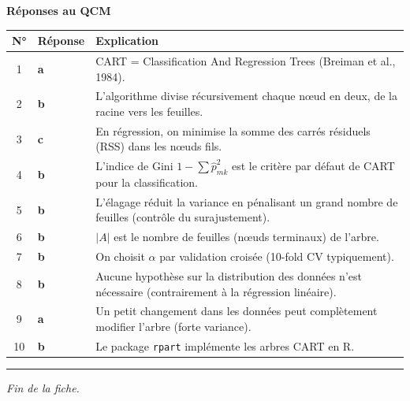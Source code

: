 \documentclass[a4paper,11pt]{article}
\begin{document}
\newpage
\label{reponses-tree}

\begin{center}
{\Large\textbf{Réponses au QCM}}
\end{center}

\medskip

\begin{tabular}{cp{2cm}p{9cm}}
\toprule
\textbf{N°} & \textbf{Réponse} & \textbf{Explication} \\
\midrule
1 & \textbf{a} & CART = Classification And Regression Trees (Breiman et al., 1984). \\
2 & \textbf{b} & L'algorithme divise récursivement chaque nœud en deux, de la racine vers les feuilles. \\
3 & \textbf{c} & En régression, on minimise la somme des carrés résiduels (RSS) dans les nœuds fils. \\
4 & \textbf{b} & L'indice de Gini $1 - \sum \hat{p}_{mk}^2$ est le critère par défaut de CART pour la classification. \\
5 & \textbf{b} & L'élagage réduit la variance en pénalisant un grand nombre de feuilles (contrôle du surajustement). \\
6 & \textbf{b} & $|A|$ est le nombre de feuilles (nœuds terminaux) de l'arbre. \\
7 & \textbf{b} & On choisit $\alpha$ par validation croisée (10-fold CV typiquement). \\
8 & \textbf{b} & Aucune hypothèse sur la distribution des données n'est nécessaire (contrairement à la régression linéaire). \\
9 & \textbf{a} & Un petit changement dans les données peut complètement modifier l'arbre (forte variance). \\
10 & \textbf{b} & Le package \texttt{rpart} implémente les arbres CART en R. \\
\bottomrule
\end{tabular}

\vspace{0.5cm}

\begin{center}
\rule{0.6\textwidth}{0.4pt}
\vspace{0.3cm}
\textit{Fin de la fiche.}
\end{center}
\end{document}

